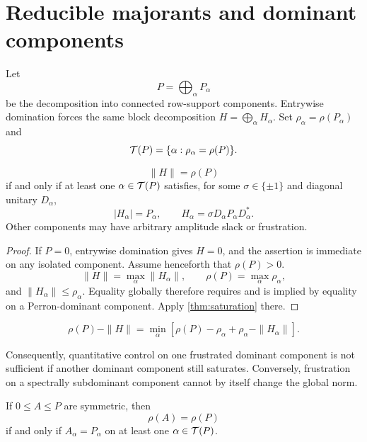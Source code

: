 \section{Reducible majorants and dominant components}
\label{sec:reducible}

Let
\[
 P=\bigoplus_{\alpha}P_\alpha
\]
be the decomposition into connected row-support components.  Entrywise
domination forces the same block decomposition
\(H=\bigoplus_\alpha H_\alpha\).  Set
\(\rho_\alpha=\rho(P_\alpha)\) and
\[
 \mathcal T(P)=\{\alpha:\rho_\alpha=\rho(P)\}.
\]

\begin{theorem}\label{thm:reducible}
\[
 \|H\|=\rho(P)
\]
if and only if at least one \(\alpha\in\mathcal T(P)\) satisfies, for some
\(\sigma\in\{\pm1\}\) and diagonal unitary \(D_\alpha\),
\[
 |H_\alpha|=P_\alpha,
 \qquad
 H_\alpha=\sigma D_\alpha P_\alpha D_\alpha^*.
\]
Other components may have arbitrary amplitude slack or frustration.
\end{theorem}

\begin{proof}
If \(P=0\), entrywise domination gives \(H=0\), and the assertion is
immediate on any isolated component.  Assume henceforth that
\(\rho(P)>0\).
\[
 \|H\|=\max_\alpha\|H_\alpha\|,
 \qquad
 \rho(P)=\max_\alpha\rho_\alpha,
\]
and \(\|H_\alpha\|\le\rho_\alpha\).  Equality globally therefore
requires and is implied by equality on a Perron-dominant component.
Apply \cref{thm:saturation} there.
\end{proof}

\begin{corollary}\label{cor:component-gap}
\begin{equation}\label{eq:component-gap}
 \boxed{\displaystyle
 \rho(P)-\|H\|
 =
 \min_\alpha
 \left[
 \rho(P)-\rho_\alpha
 +
 \rho_\alpha-\|H_\alpha\|
 \right].}
\end{equation}
\end{corollary}

Consequently, quantitative control on one frustrated dominant
component is not sufficient if another dominant component still
saturates.  Conversely, frustration on a spectrally subdominant
component cannot by itself change the global norm.

\begin{corollary}
If \(0\le A\le P\) are symmetric, then
\[
 \rho(A)=\rho(P)
\]
if and only if \(A_\alpha=P_\alpha\) on at least one
\(\alpha\in\mathcal T(P)\).
\end{corollary}
